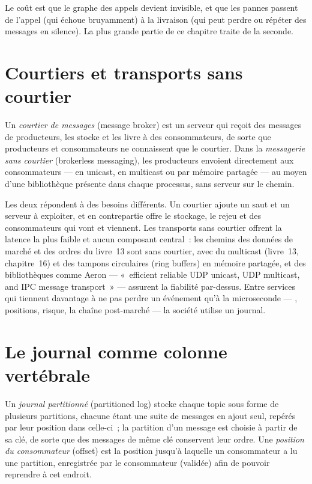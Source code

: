 Le coût est que le graphe des appels devient invisible, et que les pannes passent de l'appel (qui échoue bruyamment) à la livraison (qui peut perdre ou
répéter des messages en silence). La plus grande partie de ce chapitre traite de la seconde.

\section{Courtiers et transports sans courtier}

\begin{definition}\label{def:pl:messaging-and-event-driven-architecture:broker}
Un \emph{courtier de messages} (message broker) est un serveur qui reçoit des messages de producteurs, les stocke et les livre à des consommateurs,
de sorte que producteurs et consommateurs ne connaissent que le courtier. Dans la \emph{messagerie sans courtier} (brokerless messaging), les producteurs envoient directement
aux consommateurs --- en unicast, en multicast ou par mémoire partagée --- au moyen d'une bibliothèque présente dans chaque processus, sans serveur sur le chemin.
\end{definition}

Les deux répondent à des besoins différents. Un courtier ajoute un saut et un serveur à exploiter, et en contrepartie offre le stockage, le rejeu et des consommateurs qui vont et viennent.
Les transports sans courtier offrent la latence la plus faible et aucun composant central~: les chemins des données de marché et des ordres du livre~13 sont sans courtier, avec
du multicast (livre~13, chapitre~16) et des tampons circulaires (ring buffers) en mémoire partagée, et des bibliothèques comme Aeron --- «~efficient reliable UDP
unicast, UDP multicast, and IPC message transport~» --- assurent la fiabilité par-dessus. Entre services qui tiennent davantage à
ne pas perdre un événement qu'à la microseconde --- , positions, risque, la chaîne post-marché --- la société utilise un journal.

\section{Le journal comme colonne vertébrale}

\begin{definition}\label{def:pl:messaging-and-event-driven-architecture:log}
Un \emph{journal partitionné} (partitioned log) stocke chaque topic sous forme de plusieurs partitions, chacune étant une suite de messages en ajout seul, repérés par
leur position dans celle-ci~; la partition d'un message est choisie à partir de sa clé, de sorte que des messages de même clé conservent leur ordre. Une
\emph{position du consommateur} (offset) est la position jusqu'à laquelle un consommateur a lu une partition, enregistrée par le consommateur (validée) afin de
pouvoir reprendre à cet endroit.
\end{definition}

